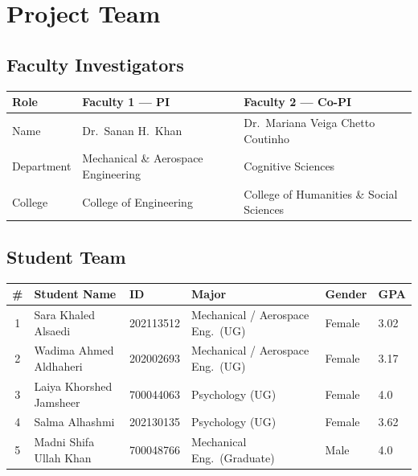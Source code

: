\documentclass[11pt,a4paper]{article}
\begin{document}
\newpage
\section*{Project Team}

\subsection*{Faculty Investigators}

\begin{tabularx}{\textwidth}{|l|X|X|}
\hline
\rowcolor{lightGray}
\textbf{Role} & \textbf{Faculty 1 --- PI} & \textbf{Faculty 2 --- Co-PI} \\ \hline
Name & Dr.\ Sanan H.\ Khan & Dr.\ Mariana Veiga Chetto Coutinho \\ \hline
Department & Mechanical \& Aerospace Engineering & Cognitive Sciences \\ \hline
College & College of Engineering & College of Humanities \& Social Sciences \\ \hline
\end{tabularx}

\vspace{0.8cm}
\subsection*{Student Team}

\begin{tabularx}{\textwidth}{|c|l|l|X|l|l|}
\hline
\rowcolor{lightGray}
\textbf{\#} & \textbf{Student Name} & \textbf{ID} & \textbf{Major} & \textbf{Gender} & \textbf{GPA} \\ \hline
1 & Sara Khaled Alsaedi & 202113512 & Mechanical / Aerospace Eng.\ (UG) & Female & 3.02 \\ \hline
2 & Wadima Ahmed Aldhaheri & 202002693 & Mechanical / Aerospace Eng.\ (UG) & Female & 3.17 \\ \hline
3 & Laiya Khorshed Jamsheer & 700044063 & Psychology (UG) & Female & 4.0 \\ \hline
4 & Salma Alhashmi & 202130135 & Psychology (UG) & Female & 3.62 \\ \hline
5 & Madni Shifa Ullah Khan & 700048766 & Mechanical Eng.\ (Graduate) & Male & 4.0 \\ \hline
\end{tabularx}
\end{document}
